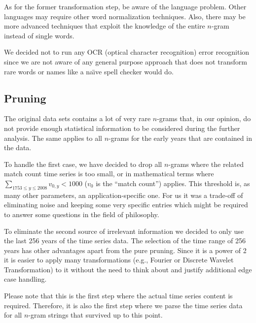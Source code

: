 As for the former transformation step, be aware of the language problem. Other languages may require other word normalization techniques. Also, there may be more advanced techniques that exploit the knowledge of the entire $n$-gram instead of single words.

We decided not to run any OCR (optical character recognition) error recognition since we are not aware of any general purpose approach that does not transform rare words or names like a na\"{\i}ve spell checker would do.


\subsection{Pruning}
\label{ssec:baseline:data:prune}
The original data sets contains a lot of very rare $n$-grams that, in our opinion, do not provide enough statistical information to be considered during the further analysis. The same applies to all $n$-grams for the early years that are contained in the data.

To handle the first case, we have decided to drop all $n$-grams where the related match count time series is too small, or in mathematical terms where $\sum_{1753 \leq y \leq 2008} v_{0, y} < 1000$ ($v_0$ is the \enquote{match count}) applies. This threshold is, as many other parameters, an application-specific one. For us it was a trade-off of eliminating noise and keeping some very specific entries which might be required to answer some questions in the field of philosophy.

To eliminate the second source of irrelevant information we decided to only use the last \num{256} years of the time series data. The selection of the time range of \num{256} years has other advantages apart from the pure pruning. Since it is a power of \num{2} it is easier to apply many transformations (e.g., Fourier or Discrete Wavelet Transformation) to it without the need to think about and justify additional edge case handling.

Please note that this is the first step where the actual time series content is required. Therefore, it is also the first step where we parse the time series data for all $n$-gram strings that survived up to this point.


